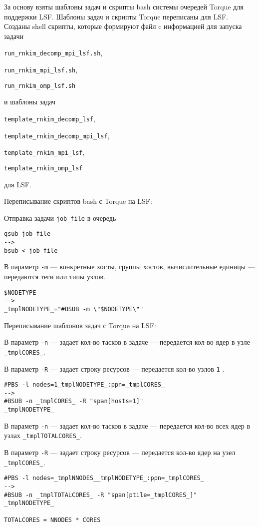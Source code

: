 За основу взяты шаблоны задач и скрипты bash системы очередей Torque для поддержки LSF. Шаблоны задач и скрипты Torque переписаны для LSF. Созданы shell скрипты, которые формируют файл c информацией для запуска задачи

\lstinline{run_rnkim_decomp_mpi_lsf.sh},

\lstinline{run_rnkim_mpi_lsf.sh},

\lstinline{run_rnkim_omp_lsf.sh}

и шаблоны задач

\lstinline{template_rnkim_decomp_lsf},

\lstinline{template_rnkim_decomp_mpi_lsf},

\lstinline{template_rnkim_mpi_lsf},

\lstinline{template_rnkim_omp_lsf}

для LSF.

Переписывание скриптов bash с Torque на LSF:

Отправка задачи \lstinline{job_file} в очередь 

\begin{lstlisting}
qsub job_file
-->
bsub < job_file
\end{lstlisting}

В параметр \lstinline{-m} --- конкретные хосты, группы хостов, вычислительные единицы --- передаются теги или типы узлов.

\begin{lstlisting}
$NODETYPE
-->
_tmplNODETYPE_="#BSUB -m \"$NODETYPE\""
\end{lstlisting}

Переписывание шаблонов задач с Torque на LSF:

В параметр \lstinline{-n} --- задает кол-во тасков в задаче --- передается кол-во ядер в узле \lstinline{_tmplCORES_}.

В параметр \lstinline{-R} --- задает строку ресурсов --- передается кол-во узлов \lstinline{1} \cite{ref_bsub}.
\begin{lstlisting}
#PBS -l nodes=1_tmplNODETYPE_:ppn=_tmplCORES_
-->
#BSUB -n _tmplCORES_ -R "span[hosts=1]"
_tmplNODETYPE_
\end{lstlisting}

В параметр \lstinline{-n} --- задает кол-во тасков в задаче --- передается кол-во всех ядер в узлах \lstinline{_tmplTOTALCORES_}.

В параметр \lstinline{-R} --- задает строку ресурсов --- передается кол-во ядер на узел \lstinline{_tmplCORES_}.
\begin{lstlisting}
#PBS -l nodes=_tmplNNODES__tmplNODETYPE_:ppn=_tmplCORES_
-->
#BSUB -n _tmplTOTALCORES_ -R "span[ptile=_tmplCORES_]"
_tmplNODETYPE_

TOTALCORES = NNODES * CORES
\end{lstlisting}

